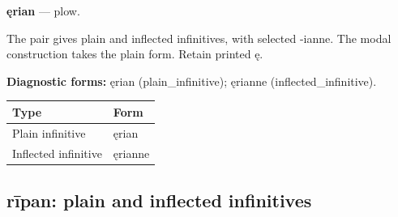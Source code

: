 \par\begin{minipage}{\linewidth}\raggedright
\textbf{ęrian} — plow.

The pair gives plain and inflected infinitives, with selected -ianne. The modal construction takes the plain form. Retain printed ę.

\textbf{Diagnostic forms:} ęrian (plain\_infinitive); ęrianne (inflected\_infinitive).

\par\begingroup
\fontsize{10.5}{13.2}\selectfont
\setlength{\LTleft}{0pt}\setlength{\LTright}{\fill}
\noindent
\begin{tabular}{@{}>{\raggedright\arraybackslash}p{71.72mm}>{\raggedright\arraybackslash}p{49.46mm}@{}}
\toprule
\textbf{Type} & \textbf{Form} \\
\midrule
Plain infinitive & ęrian \\
Inflected infinitive & ęrianne \\
\bottomrule
\end{tabular}
\par\endgroup

\end{minipage}\par
{}
\subsection*{rīpan: plain and inflected infinitives}

